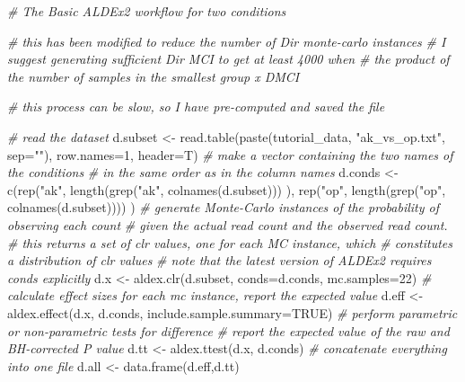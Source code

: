 \documentclass[
  onecolumn]{article}
\newenvironment{Shaded}{\begin{snugshade}}{\end{snugshade}}
\newcommand{\AttributeTok}[1]{\textcolor[rgb]{0.77,0.63,0.00}{#1}}
\newcommand{\CommentTok}[1]{\textcolor[rgb]{0.56,0.35,0.01}{\textit{#1}}}
\newcommand{\ConstantTok}[1]{\textcolor[rgb]{0.00,0.00,0.00}{#1}}
\newcommand{\DecValTok}[1]{\textcolor[rgb]{0.00,0.00,0.81}{#1}}
\newcommand{\FunctionTok}[1]{\textcolor[rgb]{0.00,0.00,0.00}{#1}}
\newcommand{\NormalTok}[1]{#1}
\newcommand{\OtherTok}[1]{\textcolor[rgb]{0.56,0.35,0.01}{#1}}
\newcommand{\StringTok}[1]{\textcolor[rgb]{0.31,0.60,0.02}{#1}}
\begin{document}
\begin{Shaded}
\begin{Highlighting}[]
\CommentTok{\# The Basic ALDEx2 workflow for two conditions}

\CommentTok{\# this has been modified to reduce the number of Dir monte{-}carlo instances}
\CommentTok{\# I suggest generating sufficient Dir MCI to get at least 4000 when}
\CommentTok{\# the product of the number of samples in the smallest group x DMCI}

\CommentTok{\# this process can be slow, so I have pre{-}computed and saved the file}


\CommentTok{\# read the dataset}
\NormalTok{d.subset }\OtherTok{\textless{}{-}} \FunctionTok{read.table}\NormalTok{(}\FunctionTok{paste}\NormalTok{(tutorial\_data, }\StringTok{"ak\_vs\_op.txt"}\NormalTok{, }\AttributeTok{sep=}\StringTok{""}\NormalTok{),}
    \AttributeTok{row.names=}\DecValTok{1}\NormalTok{, }\AttributeTok{header=}\NormalTok{T)}
\CommentTok{\# make a vector containing the two names of the conditions}
\CommentTok{\# in the same order as in the column names}
\NormalTok{d.conds }\OtherTok{\textless{}{-}} \FunctionTok{c}\NormalTok{(}\FunctionTok{rep}\NormalTok{(}\StringTok{"ak"}\NormalTok{, }\FunctionTok{length}\NormalTok{(}\FunctionTok{grep}\NormalTok{(}\StringTok{"ak"}\NormalTok{, }\FunctionTok{colnames}\NormalTok{(d.subset))) ),}
    \FunctionTok{rep}\NormalTok{(}\StringTok{"op"}\NormalTok{, }\FunctionTok{length}\NormalTok{(}\FunctionTok{grep}\NormalTok{(}\StringTok{"op"}\NormalTok{, }\FunctionTok{colnames}\NormalTok{(d.subset)))) )}
\CommentTok{\# generate Monte{-}Carlo instances of the probability of observing each count}
\CommentTok{\# given the actual read count and the observed read count.}
\CommentTok{\# this returns a set of clr values, one for each MC instance, which}
\CommentTok{\# constitutes a distribution of clr values}
\CommentTok{\# note that the latest version of ALDEx2 requires conds explicitly}
\NormalTok{d.x }\OtherTok{\textless{}{-}} \FunctionTok{aldex.clr}\NormalTok{(d.subset, }\AttributeTok{conds=}\NormalTok{d.conds, }\AttributeTok{mc.samples=}\DecValTok{22}\NormalTok{)}
\CommentTok{\# calculate effect sizes for each mc instance, report the expected value}
\NormalTok{d.eff }\OtherTok{\textless{}{-}} \FunctionTok{aldex.effect}\NormalTok{(d.x, d.conds, }\AttributeTok{include.sample.summary=}\ConstantTok{TRUE}\NormalTok{)}
\CommentTok{\# perform parametric or non{-}parametric tests for difference}
\CommentTok{\# report the expected value of the raw and BH{-}corrected P value}
\NormalTok{d.tt }\OtherTok{\textless{}{-}} \FunctionTok{aldex.ttest}\NormalTok{(d.x, d.conds)}
\CommentTok{\# concatenate everything into one file}
\NormalTok{d.all }\OtherTok{\textless{}{-}} \FunctionTok{data.frame}\NormalTok{(d.eff,d.tt)}


\end{Highlighting}
\end{Shaded}
\end{document}
